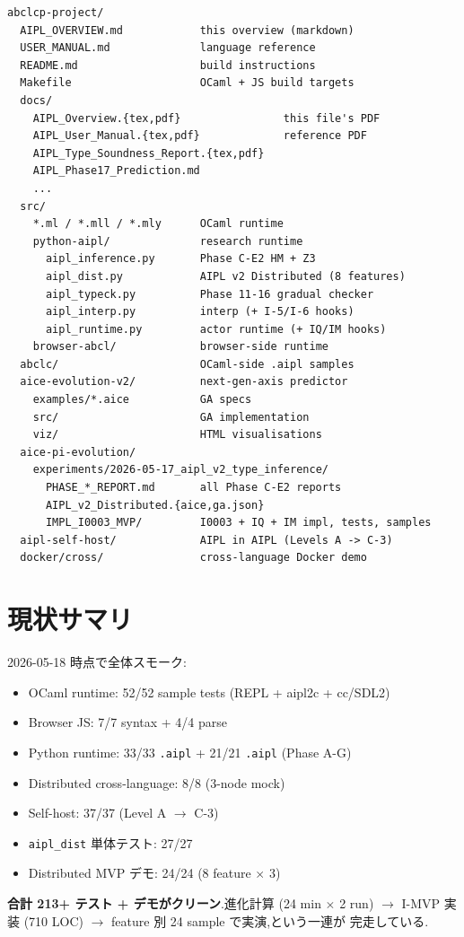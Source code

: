 \documentclass[11pt,a4paper]{article}
\begin{document}
\begin{lstlisting}
abclcp-project/
  AIPL_OVERVIEW.md            this overview (markdown)
  USER_MANUAL.md              language reference
  README.md                   build instructions
  Makefile                    OCaml + JS build targets
  docs/
    AIPL_Overview.{tex,pdf}                this file's PDF
    AIPL_User_Manual.{tex,pdf}             reference PDF
    AIPL_Type_Soundness_Report.{tex,pdf}
    AIPL_Phase17_Prediction.md
    ...
  src/
    *.ml / *.mll / *.mly      OCaml runtime
    python-aipl/              research runtime
      aipl_inference.py       Phase C-E2 HM + Z3
      aipl_dist.py            AIPL v2 Distributed (8 features)
      aipl_typeck.py          Phase 11-16 gradual checker
      aipl_interp.py          interp (+ I-5/I-6 hooks)
      aipl_runtime.py         actor runtime (+ IQ/IM hooks)
    browser-abcl/             browser-side runtime
  abclc/                      OCaml-side .aipl samples
  aice-evolution-v2/          next-gen-axis predictor
    examples/*.aice           GA specs
    src/                      GA implementation
    viz/                      HTML visualisations
  aice-pi-evolution/
    experiments/2026-05-17_aipl_v2_type_inference/
      PHASE_*_REPORT.md       all Phase C-E2 reports
      AIPL_v2_Distributed.{aice,ga.json}
      IMPL_I0003_MVP/         I0003 + IQ + IM impl, tests, samples
  aipl-self-host/             AIPL in AIPL (Levels A -> C-3)
  docker/cross/               cross-language Docker demo
\end{lstlisting}

\section{現状サマリ}

2026-05-18 時点で全体スモーク:

\begin{itemize}\setlength{\itemsep}{0pt}
\item OCaml runtime: 52/52 sample tests (REPL + aipl2c + cc/SDL2)
\item Browser JS: 7/7 syntax + 4/4 parse
\item Python runtime: 33/33 \texttt{.aipl} + 21/21 \texttt{.aipl} (Phase A-G)
\item Distributed cross-language: 8/8 (3-node mock)
\item Self-host: 37/37 (Level A $\to$ C-3)
\item \texttt{aipl\_dist} 単体テスト: 27/27
\item Distributed MVP デモ: 24/24 (8 feature $\times$ 3)
\end{itemize}

\textbf{合計 213+ テスト + デモがクリーン}.進化計算 (24 min $\times$ 2 run)
$\to$ I-MVP 実装 (710 LOC) $\to$ feature 別 24 sample で実演,という一連が
完走している.
\end{document}

